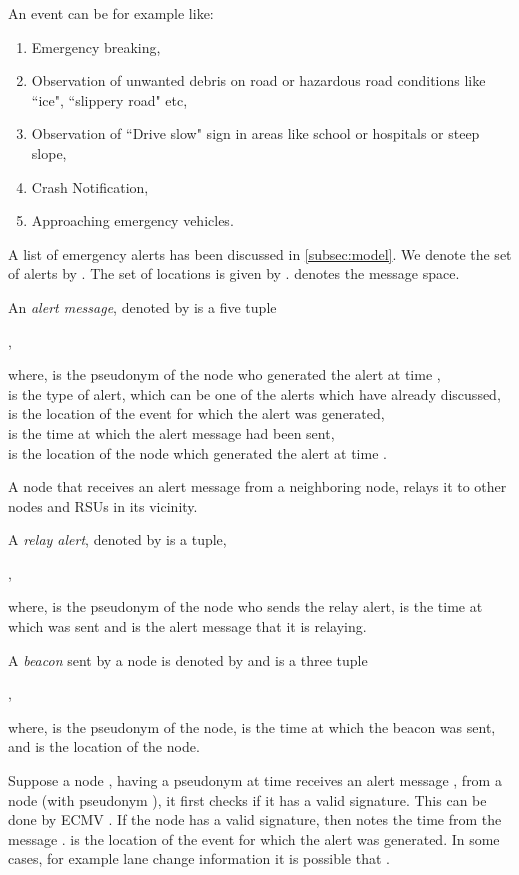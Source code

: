 \documentclass[conference]{IEEEtran}[10pt]
\begin{document}
An event  can be for example like:
\begin{enumerate}
\item Emergency breaking,
\item Observation of unwanted debris on road or hazardous road conditions like ``ice", ``slippery road" etc,
\item Observation of ``Drive slow" sign in areas like school or hospitals or steep slope,
\item Crash Notification,
\item Approaching emergency vehicles.
\end{enumerate}
A list of emergency alerts has been discussed in \ref{subsec:model}. 
We denote the set of alerts by . 
The set of locations is given by .  
 denotes the message space. 

An  \emph{alert message}, denoted by  is a five tuple 
\begin{center}
, 
\end{center}
where,
 is the pseudonym of the node  who generated the alert at time , \\
 is the type of alert, which can be one of the alerts which have already discussed, \\
 is the location of the event  for which the alert was generated, \\
 is the time at which the alert message had been sent, \\
 is the location of the node  which generated the alert at time .

A node that receives an alert message from a neighboring node, relays it to other nodes and RSUs in its vicinity. 


A \emph{relay alert}, denoted by  is a  tuple, 
\begin{center}
,
\end{center}
where, 
 is the pseudonym of the node  who sends the relay alert, 
 is the time at which  was sent and 
 is the alert message that it is relaying. 


A \emph{beacon} sent by a node is denoted by  and is a three tuple
\begin{center}
,
\end{center}
where, 
 is the pseudonym of the node, 
 is the time at which the beacon was sent, and
 is the location of the node. 


Suppose a node , having a pseudonym  at time  receives an alert message , 
from a node  (with pseudonym ), it first checks if it has a valid signature. 
This can be done by ECMV \cite{WJS08}. 
If the node  has a valid signature, then  notes the time  from the message . 
 is the location of the event for which the alert was generated. In some cases, for example
lane change information it is possible that . 
\end{document}
